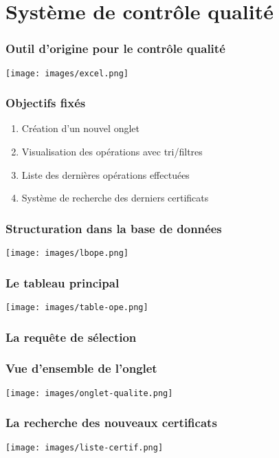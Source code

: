 \section{Système de contrôle qualité}

\begin{frame}
    \frametitle{Outil d'origine pour le contrôle qualité}
    \texttt{[image: images/excel.png]}
\end{frame}

\begin{frame} 
    \frametitle{Objectifs fixés}
    \begin{enumerate}
        \item<2-> Création d'un nouvel onglet 
        \item<3-> Visualisation des opérations avec tri/filtres
        \item<4-> Liste des dernières opérations effectuées
        \item<5-> Système de recherche des derniers certificats
    \end{enumerate}
\end{frame}

\begin{frame}
    \frametitle{Structuration dans la base de données}
    \texttt{[image: images/lbope.png]}
\end{frame}

\begin{frame}
    \frametitle{Le tableau principal}
    \texttt{[image: images/table-ope.png]}
\end{frame}

\begin{frame}[fragile] \transwipe[duration=0.5]
    \frametitle{La requête de sélection}
    \begin{sourcecode}
        
    \end{sourcecode}
\end{frame}

\begin{frame}
    \frametitle{Vue d'ensemble de l'onglet }
    \texttt{[image: images/onglet-qualite.png]}
\end{frame}

\begin{frame}
    \frametitle{La recherche des nouveaux certificats}
    \texttt{[image: images/liste-certif.png]}
\end{frame}

